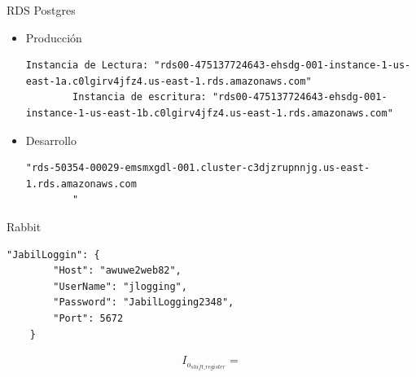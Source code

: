 \documentclass[a4paper, 10pt]{article}
\begin{document}
RDS Postgres
\begin{itemize}
	\item Producción
	\begin{lstlisting}[language={[Sharp]C}]
		Instancia de Lectura: "rds00-475137724643-ehsdg-001-instance-1-us-east-1a.c0lgirv4jfz4.us-east-1.rds.amazonaws.com"
		Instancia de escritura: "rds00-475137724643-ehsdg-001-instance-1-us-east-1b.c0lgirv4jfz4.us-east-1.rds.amazonaws.com"
	\end{lstlisting}
	
	\item Desarrollo
	\begin{lstlisting}[language={[Sharp]C}]
		"rds-50354-00029-emsmxgdl-001.cluster-c3djzrupnnjg.us-east-1.rds.amazonaws.com
		"
	\end{lstlisting}

\end{itemize}

 Rabbit
\begin{lstlisting}[language={[Sharp]C}]
	"JabilLoggin": {
		"Host": "awuwe2web82",
		"UserName": "jlogging",
		"Password": "JabilLogging2348",
		"Port": 5672
	}
\end{lstlisting}

\begin{align}
	I_{o_{shift \_ register}} = 
\end{align}
\end{document}
